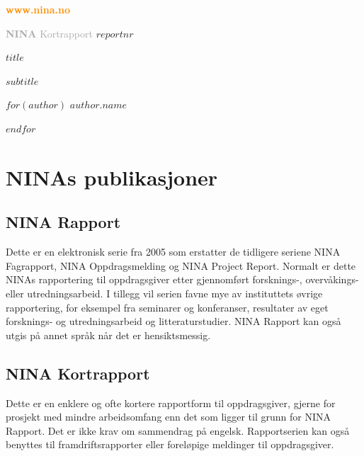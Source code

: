 \documentclass[11pt, a4paper]{article}
\newcommand{\shadOrange}[1]{\textcolor{darkOrange}{#1}}
\newcommand{\orange}[1]{\textcolor{lightOrange}{#1}}
\newcommand{\darkGrey}[1]{\textcolor{darkgrey}{#1}}
\begin{document}
\begin{titlepage}

\thispagestyle{titlefooter}
\begin{center}
\vspace{-1cm}
\LARGE\shadOrange{\textbf{www.nina.no}}
\end{center}
\vspace{2cm}

\hspace{-1cm}\Huge{\darkGrey{\textbf{NINA} Kortrapport}} \hspace{.7cm} \textbf{\orange{$reportnr$}}
\vspace{2cm}

\hspace{-1cm}\Huge{$title$} \par\vspace{.5cm}
\hspace{-1cm}\huge{$subtitle$} \par\vspace{1cm}

$for(author)$
\hspace{-1cm}\LARGE{$author.name$} \par
$endfor$

\restoregeometry
\end{titlepage}

\cfoot{}
\section*{NINAs publikasjoner}

\subsection*{NINA Rapport}
Dette er en elektronisk serie fra 2005 som erstatter de tidligere seriene NINA Fagrapport, NINA Oppdragsmelding og NINA Project Report. Normalt er dette NINAs rapportering til oppdragsgiver etter gjennomført forsknings-, overvåkings- eller utredningsarbeid. I tillegg vil serien favne mye av instituttets øvrige rapportering, for eksempel fra seminarer og konferanser, resultater av eget forsknings- og utredningsarbeid og litteraturstudier. NINA Rapport kan også utgis på annet språk når det er hensiktsmessig.

\subsection*{NINA Kortrapport}
Dette er en enklere og ofte kortere rapportform til oppdragsgiver, gjerne for prosjekt med mindre arbeidsomfang enn det som ligger til grunn for NINA Rapport. Det er ikke krav om sammendrag på engelsk. Rapportserien kan også benyttes til framdriftsrapporter eller foreløpige meldinger til oppdragsgiver.
\end{document}
